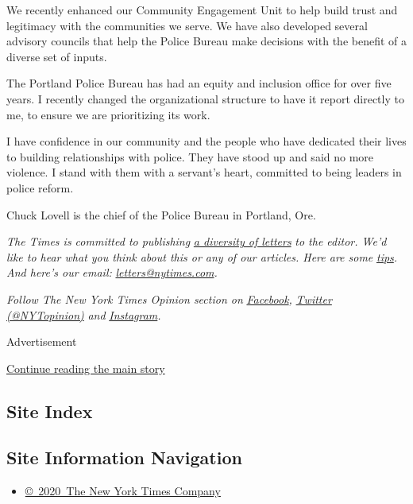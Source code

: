 We recently enhanced our Community Engagement Unit to help build trust
and legitimacy with the communities we serve. We have also developed
several advisory councils that help the Police Bureau make decisions
with the benefit of a diverse set of inputs.

The Portland Police Bureau has had an equity and inclusion office for
over five years. I recently changed the organizational structure to have
it report directly to me, to ensure we are prioritizing its work.

I have confidence in our community and the people who have dedicated
their lives to building relationships with police. They have stood up
and said no more violence. I stand with them with a servant's heart,
committed to being leaders in police reform.

Chuck Lovell is the chief of the Police Bureau in Portland, Ore.

\emph{The Times is committed to publishing}
\href{https://www.nytimes.com/2019/01/31/opinion/letters/letters-to-editor-new-york-times-women.html}{\emph{a
diversity of letters}} \emph{to the editor. We'd like to hear what you
think about this or any of our articles. Here are some}
\href{https://help.nytimes.com/hc/en-us/articles/115014925288-How-to-submit-a-letter-to-the-editor}{\emph{tips}}\emph{.
And here's our email:}
\href{mailto:letters@nytimes.com}{\emph{letters@nytimes.com}}\emph{.}

\emph{Follow The New York Times Opinion section on}
\href{https://www.facebook.com/nytopinion}{\emph{Facebook}}\emph{,}
\href{http://twitter.com/NYTOpinion}{\emph{Twitter (@NYTopinion)}}
\emph{and}
\href{https://www.instagram.com/nytopinion/}{\emph{Instagram}}\emph{.}

Advertisement

\protect\hyperlink{after-bottom}{Continue reading the main story}

\hypertarget{site-index}{%
\subsection{Site Index}\label{site-index}}

\hypertarget{site-information-navigation}{%
\subsection{Site Information
Navigation}\label{site-information-navigation}}

\begin{itemize}
\tightlist
\item
  \href{https://help.nytimes.com/hc/en-us/articles/115014792127-Copyright-notice}{©~2020~The
  New York Times Company}
\end{itemize}

